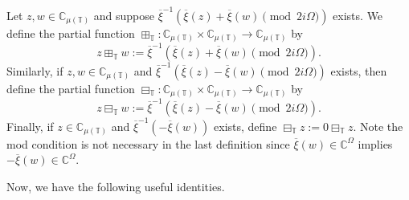 \documentclass[reqno]{amsart}
\begin{document}
\begin{definition} \rm
Let $z,w \in \mathbb{C}_{\mu(\mathbb{T})}$ and suppose
$\overline{\xi}^{-1}(\overline{\xi}(z) + \overline{\xi}(w)\pmod {2 i \Omega} )$ exists.
We define the partial function
$\boxplus_{\mathbb{T}}:\mathbb{C}_{\mu(\mathbb{T})} \times \mathbb{C}_{\mu(\mathbb{T})} \to \mathbb{C}_{\mu(\mathbb{T})}$ by
\[ %
 z \boxplus_{\mathbb{T}} w := \overline{\xi}^{-1}(\overline{\xi}(z) + \overline{\xi}(w) \pmod {2 i \Omega}  ).
\]
Similarly, if $z,w \in \mathbb{C}_{\mu(\mathbb{T})}$ and $\overline{\xi}^{-1}(\overline{\xi}(z)
- \overline{\xi}(w) \pmod{2 i \Omega} )$ exists, then define the partial function
$\boxminus_{\mathbb{T}}:\mathbb{C}_{\mu(\mathbb{T})} \times \mathbb{C}_{\mu(\mathbb{T})} \to \mathbb{C}_{\mu(\mathbb{T})}$ by
\[%
 z \boxminus_{\mathbb{T}} w := \overline{\xi}^{-1}(\overline{\xi}(z) - \overline{\xi}(w) \pmod{2 i \Omega}  ).
\]
Finally, if $z \in \mathbb{C}_{\mu(\mathbb{T})}$ and $\overline{\xi}^{-1}(- \overline{\xi}(w) )$ exists, define
 $\boxminus_{\mathbb{T}} z := 0 \boxminus_{\mathbb{T}} z$. Note the mod condition is not necessary
in the last definition since $\overline{\xi}(w) \in \mathbb{C}^{\Omega}$ implies
$-\overline{\xi}(w) \in \mathbb{C}^{\Omega}$.
\end{definition}

Now, we have the following useful identities.
\end{document}
